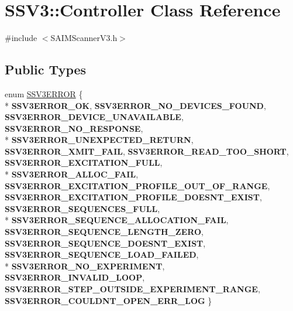 \hypertarget{classSSV3_1_1Controller}{}\section{S\+S\+V3\+:\+:Controller Class Reference}
\label{classSSV3_1_1Controller}


{\ttfamily \#include $<$S\+A\+I\+M\+Scanner\+V3.\+h$>$}

\subsection*{Public Types}
\begin{DoxyCompactItemize}
\item 
enum \hyperlink{classSSV3_1_1Controller_a8ff24a92ec373aa1257dcfe2aa2e5406}{S\+S\+V3\+E\+R\+R\+OR} \{ \\*
{\bfseries S\+S\+V3\+E\+R\+R\+O\+R\+\_\+\+OK}, 
{\bfseries S\+S\+V3\+E\+R\+R\+O\+R\+\_\+\+N\+O\+\_\+\+D\+E\+V\+I\+C\+E\+S\+\_\+\+F\+O\+U\+ND}, 
{\bfseries S\+S\+V3\+E\+R\+R\+O\+R\+\_\+\+D\+E\+V\+I\+C\+E\+\_\+\+U\+N\+A\+V\+A\+I\+L\+A\+B\+LE}, 
{\bfseries S\+S\+V3\+E\+R\+R\+O\+R\+\_\+\+N\+O\+\_\+\+R\+E\+S\+P\+O\+N\+SE}, 
\\*
{\bfseries S\+S\+V3\+E\+R\+R\+O\+R\+\_\+\+U\+N\+E\+X\+P\+E\+C\+T\+E\+D\+\_\+\+R\+E\+T\+U\+RN}, 
{\bfseries S\+S\+V3\+E\+R\+R\+O\+R\+\_\+\+X\+M\+I\+T\+\_\+\+F\+A\+IL}, 
{\bfseries S\+S\+V3\+E\+R\+R\+O\+R\+\_\+\+R\+E\+A\+D\+\_\+\+T\+O\+O\+\_\+\+S\+H\+O\+RT}, 
{\bfseries S\+S\+V3\+E\+R\+R\+O\+R\+\_\+\+E\+X\+C\+I\+T\+A\+T\+I\+O\+N\+\_\+\+F\+U\+LL}, 
\\*
{\bfseries S\+S\+V3\+E\+R\+R\+O\+R\+\_\+\+A\+L\+L\+O\+C\+\_\+\+F\+A\+IL}, 
{\bfseries S\+S\+V3\+E\+R\+R\+O\+R\+\_\+\+E\+X\+C\+I\+T\+A\+T\+I\+O\+N\+\_\+\+P\+R\+O\+F\+I\+L\+E\+\_\+\+O\+U\+T\+\_\+\+O\+F\+\_\+\+R\+A\+N\+GE}, 
{\bfseries S\+S\+V3\+E\+R\+R\+O\+R\+\_\+\+E\+X\+C\+I\+T\+A\+T\+I\+O\+N\+\_\+\+P\+R\+O\+F\+I\+L\+E\+\_\+\+D\+O\+E\+S\+N\+T\+\_\+\+E\+X\+I\+ST}, 
{\bfseries S\+S\+V3\+E\+R\+R\+O\+R\+\_\+\+S\+E\+Q\+U\+E\+N\+C\+E\+S\+\_\+\+F\+U\+LL}, 
\\*
{\bfseries S\+S\+V3\+E\+R\+R\+O\+R\+\_\+\+S\+E\+Q\+U\+E\+N\+C\+E\+\_\+\+A\+L\+L\+O\+C\+A\+T\+I\+O\+N\+\_\+\+F\+A\+IL}, 
{\bfseries S\+S\+V3\+E\+R\+R\+O\+R\+\_\+\+S\+E\+Q\+U\+E\+N\+C\+E\+\_\+\+L\+E\+N\+G\+T\+H\+\_\+\+Z\+E\+RO}, 
{\bfseries S\+S\+V3\+E\+R\+R\+O\+R\+\_\+\+S\+E\+Q\+U\+E\+N\+C\+E\+\_\+\+D\+O\+E\+S\+N\+T\+\_\+\+E\+X\+I\+ST}, 
{\bfseries S\+S\+V3\+E\+R\+R\+O\+R\+\_\+\+S\+E\+Q\+U\+E\+N\+C\+E\+\_\+\+L\+O\+A\+D\+\_\+\+F\+A\+I\+L\+ED}, 
\\*
{\bfseries S\+S\+V3\+E\+R\+R\+O\+R\+\_\+\+N\+O\+\_\+\+E\+X\+P\+E\+R\+I\+M\+E\+NT}, 
{\bfseries S\+S\+V3\+E\+R\+R\+O\+R\+\_\+\+I\+N\+V\+A\+L\+I\+D\+\_\+\+L\+O\+OP}, 
{\bfseries S\+S\+V3\+E\+R\+R\+O\+R\+\_\+\+S\+T\+E\+P\+\_\+\+O\+U\+T\+S\+I\+D\+E\+\_\+\+E\+X\+P\+E\+R\+I\+M\+E\+N\+T\+\_\+\+R\+A\+N\+GE}, 
{\bfseries S\+S\+V3\+E\+R\+R\+O\+R\+\_\+\+C\+O\+U\+L\+D\+N\+T\+\_\+\+O\+P\+E\+N\+\_\+\+E\+R\+R\+\_\+\+L\+OG}
 \}
\end{DoxyCompactItemize}
